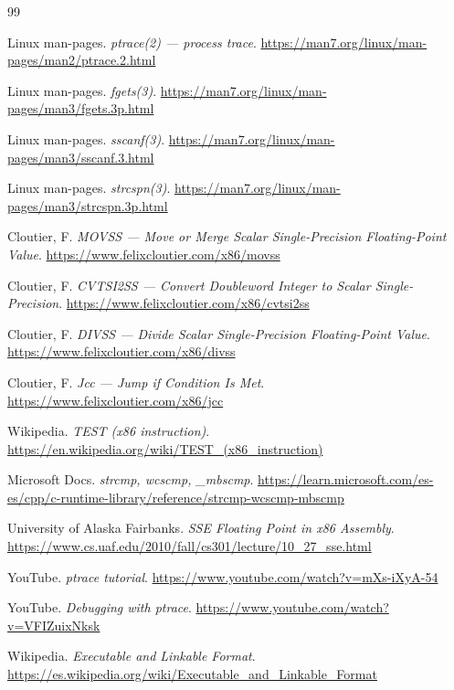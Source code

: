 \documentclass[10pt,a4paper]{article}
\begin{document}
\begin{thebibliography}{99}

Linux man-pages. \textit{ptrace(2) --- process trace}.
\url{https://man7.org/linux/man-pages/man2/ptrace.2.html}

Linux man-pages. \textit{fgets(3)}.
\url{https://man7.org/linux/man-pages/man3/fgets.3p.html}

Linux man-pages. \textit{sscanf(3)}.
\url{https://man7.org/linux/man-pages/man3/sscanf.3.html}

Linux man-pages. \textit{strcspn(3)}.
\url{https://man7.org/linux/man-pages/man3/strcspn.3p.html}

Cloutier, F. \textit{MOVSS --- Move or Merge Scalar Single-Precision Floating-Point Value}.
\url{https://www.felixcloutier.com/x86/movss}

Cloutier, F. \textit{CVTSI2SS --- Convert Doubleword Integer to Scalar Single-Precision}.
\url{https://www.felixcloutier.com/x86/cvtsi2ss}

Cloutier, F. \textit{DIVSS --- Divide Scalar Single-Precision Floating-Point Value}.
\url{https://www.felixcloutier.com/x86/divss}

Cloutier, F. \textit{Jcc --- Jump if Condition Is Met}.
\url{https://www.felixcloutier.com/x86/jcc}

Wikipedia. \textit{TEST (x86 instruction)}.
\url{https://en.wikipedia.org/wiki/TEST_(x86_instruction)}

Microsoft Docs. \textit{strcmp, wcscmp, \_mbscmp}.
\url{https://learn.microsoft.com/es-es/cpp/c-runtime-library/reference/strcmp-wcscmp-mbscmp}

University of Alaska Fairbanks. \textit{SSE Floating Point in x86 Assembly}.
\url{https://www.cs.uaf.edu/2010/fall/cs301/lecture/10_27_sse.html}

YouTube. \textit{ptrace tutorial}.
\url{https://www.youtube.com/watch?v=mXs-iXyA-54}

YouTube. \textit{Debugging with ptrace}.
\url{https://www.youtube.com/watch?v=VFIZuixNksk}

Wikipedia. \textit{Executable and Linkable Format}.
\url{https://es.wikipedia.org/wiki/Executable_and_Linkable_Format}


\end{thebibliography}
\end{document}
